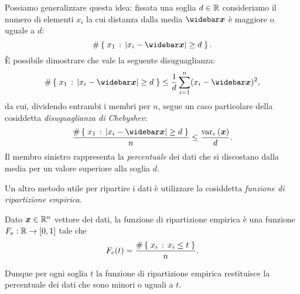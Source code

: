 Possiamo generalizzare questa idea: fissata una soglia $d \in \mathbb{R}$ consideriamo il numero di elementi $x_i$ la cui distanza dalla media $\mean x$ è maggiore o uguale a $d$: \[
    \#\set{x_1 \suchthat \abs*{x_i - \mean x} \geq d}.
\] È possibile dimostrare che vale la seguente disuguaglianza: \[
    \#\set{x_1 \suchthat \abs*{x_i - \mean x} \geq d} \leq \frac{1}{d}\sum_{i=1}^n (x_i - \mean x)^2,
\] da cui, dividendo entrambi i membri per $n$, segue un caso particolare della cosiddetta \emph{disuguaglianza di Chebyshev}: \begin{equation}
    \frac{\#\set{x_1 \suchthat \abs*{x_i - \mean x} \geq d}}{n} \leq \frac{\var*{\vec x}}{d}.
\end{equation} Il membro sinistro rappresenta la \emph{percentuale} dei dati che si discostano dalla media per un valore superiore alla soglia $d$.

Un altro metodo utile per ripartire i dati è utilizzare la cosiddetta \emph{funzione di ripartizione empirica}.
\begin{definition}
    Dato $\bm{x} \in \mathbb{R}^n$ vettore dei dati, la funzione di ripartizione empirica è una funzione $F_e : \mathbb{R} \to [0,1]$ tale che \begin{equation*}
        F_e(t) = \frac{\#\left\{\;x_i \,:\, x_i \leq t\;\right\}}{n}.
    \end{equation*}
\end{definition}
Dunque per ogni soglia $t$ la funzione di ripartizione empirica restituisce la percentuale dei dati che sono minori o uguali a $t$.


